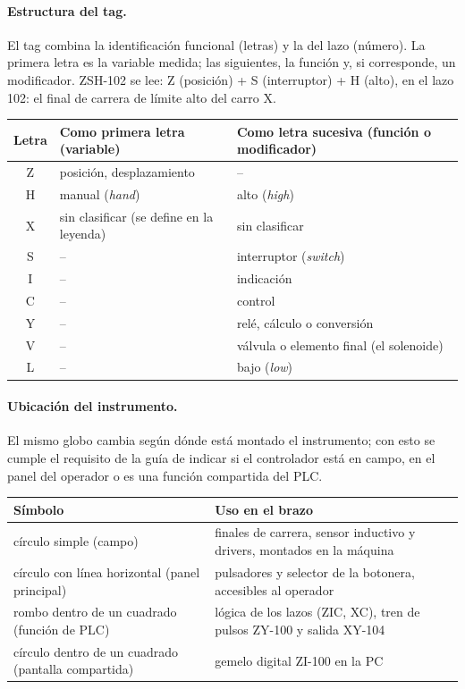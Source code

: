 \documentclass[a4paper,11pt]{article}
\begin{document}
\paragraph{Estructura del tag.} El tag combina la identificación funcional (letras) y la del lazo (número). La primera letra es la variable medida; las siguientes, la función y, si corresponde, un modificador. ZSH-102 se lee: Z (posición) + S (interruptor) + H (alto), en el lazo 102: el final de carrera de límite alto del carro X.
\begin{center}\small
\begin{tabularx}{\linewidth}{c >{\raggedright}X >{\raggedright\arraybackslash}X}
\toprule
\textbf{Letra} & \textbf{Como primera letra (variable)} & \textbf{Como letra sucesiva (función o modificador)}\\
\midrule
Z & posición, desplazamiento & --\\
H & manual (\emph{hand}) & alto (\emph{high})\\
X & sin clasificar (se define en la leyenda) & sin clasificar\\
S & -- & interruptor (\emph{switch})\\
I & -- & indicación\\
C & -- & control\\
Y & -- & relé, cálculo o conversión\\
V & -- & válvula o elemento final (el solenoide)\\
L & -- & bajo (\emph{low})\\
\bottomrule
\end{tabularx}\end{center}

\paragraph{Ubicación del instrumento.} El mismo globo cambia según dónde está montado el instrumento; con esto se cumple el requisito de la guía de indicar si el controlador está en campo, en el panel del operador o es una función compartida del PLC.
\begin{center}\small
\begin{tabularx}{\linewidth}{>{\raggedright}p{4cm} >{\raggedright\arraybackslash}X}
\toprule
\textbf{Símbolo} & \textbf{Uso en el brazo}\\
\midrule
círculo simple (campo) & finales de carrera, sensor inductivo y drivers, montados en la máquina\\
círculo con línea horizontal (panel principal) & pulsadores y selector de la botonera, accesibles al operador\\
rombo dentro de un cuadrado (función de PLC) & lógica de los lazos (ZIC, XC), tren de pulsos ZY-100 y salida XY-104\\
círculo dentro de un cuadrado (pantalla compartida) & gemelo digital ZI-100 en la PC\\
\bottomrule
\end{tabularx}\end{center}
\end{document}
